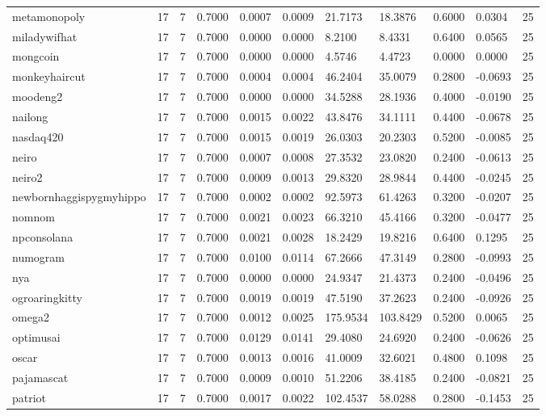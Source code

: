 \begin{table}[htbp]
\begin{tabular}{lllllllllll}
metamonopoly & 17 & 7 & 0.7000 & 0.0007 & 0.0009 & 21.7173 & 18.3876 & 0.6000 & 0.0304 & 25 \\
miladywifhat & 17 & 7 & 0.7000 & 0.0000 & 0.0000 & 8.2100 & 8.4331 & 0.6400 & 0.0565 & 25 \\
mongcoin & 17 & 7 & 0.7000 & 0.0000 & 0.0000 & 4.5746 & 4.4723 & 0.0000 & 0.0000 & 25 \\
monkeyhaircut & 17 & 7 & 0.7000 & 0.0004 & 0.0004 & 46.2404 & 35.0079 & 0.2800 & -0.0693 & 25 \\
moodeng2 & 17 & 7 & 0.7000 & 0.0000 & 0.0000 & 34.5288 & 28.1936 & 0.4000 & -0.0190 & 25 \\
nailong & 17 & 7 & 0.7000 & 0.0015 & 0.0022 & 43.8476 & 34.1111 & 0.4400 & -0.0678 & 25 \\
nasdaq420 & 17 & 7 & 0.7000 & 0.0015 & 0.0019 & 26.0303 & 20.2303 & 0.5200 & -0.0085 & 25 \\
neiro & 17 & 7 & 0.7000 & 0.0007 & 0.0008 & 27.3532 & 23.0820 & 0.2400 & -0.0613 & 25 \\
neiro2 & 17 & 7 & 0.7000 & 0.0009 & 0.0013 & 29.8320 & 28.9844 & 0.4400 & -0.0245 & 25 \\
newbornhaggispygmyhippo & 17 & 7 & 0.7000 & 0.0002 & 0.0002 & 92.5973 & 61.4263 & 0.3200 & -0.0207 & 25 \\
nomnom & 17 & 7 & 0.7000 & 0.0021 & 0.0023 & 66.3210 & 45.4166 & 0.3200 & -0.0477 & 25 \\
npconsolana & 17 & 7 & 0.7000 & 0.0021 & 0.0028 & 18.2429 & 19.8216 & 0.6400 & 0.1295 & 25 \\
numogram & 17 & 7 & 0.7000 & 0.0100 & 0.0114 & 67.2666 & 47.3149 & 0.2800 & -0.0993 & 25 \\
nya & 17 & 7 & 0.7000 & 0.0000 & 0.0000 & 24.9347 & 21.4373 & 0.2400 & -0.0496 & 25 \\
ogroaringkitty & 17 & 7 & 0.7000 & 0.0019 & 0.0019 & 47.5190 & 37.2623 & 0.2400 & -0.0926 & 25 \\
omega2 & 17 & 7 & 0.7000 & 0.0012 & 0.0025 & 175.9534 & 103.8429 & 0.5200 & 0.0065 & 25 \\
optimusai & 17 & 7 & 0.7000 & 0.0129 & 0.0141 & 29.4080 & 24.6920 & 0.2400 & -0.0626 & 25 \\
oscar & 17 & 7 & 0.7000 & 0.0013 & 0.0016 & 41.0009 & 32.6021 & 0.4800 & 0.1098 & 25 \\
pajamascat & 17 & 7 & 0.7000 & 0.0009 & 0.0010 & 51.2206 & 38.4185 & 0.2400 & -0.0821 & 25 \\
patriot & 17 & 7 & 0.7000 & 0.0017 & 0.0022 & 102.4537 & 58.0288 & 0.2800 & -0.1453 & 25 \\

\end{tabular}
\end{table}
